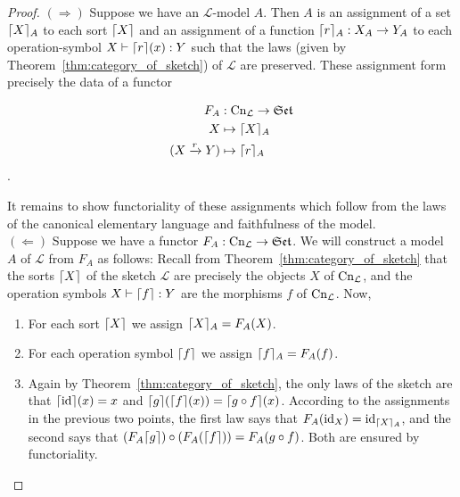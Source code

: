 \documentclass[12pt,twoside]{reedthesis}
\theoremstyle{definition}
\theoremstyle{remark}
\theoremstyle{plain}
\DeclarePairedDelimiter\ceil{\lceil}{\rceil}
\begin{document}
\begin{proof}
  \( (\Rightarrow) \) Suppose we have an \( \mathcal{L}\)-model $A$. Then $A$ is an
  assignment of a set $\ceil{X}_{A}$ to each sort \( \ceil{X}\) and an
  assignment of a function \( \ceil{r}_{A} : X_{A} \rightarrow Y_{A}\) to each operation-symbol
  \( X \vdash \ceil{r}(x) : Y\) such that the laws (given by
  Theorem~\ref{thm:category_of_sketch}) of \( \mathcal{L} \) are preserved. These
  assignment form precisely the data of a functor

  \begin{align*}
   F_{A} &: \cn_{\mathcal{L}} \rightarrow \mathfrak{Set} \\
    X &\mapsto \ceil{X}_{A} \\
    (X \xrightarrow{r} Y) &\mapsto \ceil{r}_{A}
  \end{align*}.

  It remains to show functoriality of these assignments which follow from the
  laws of the canonical elementary language and faithfulness of the model. \\

  \( (\Leftarrow) \) Suppose we have a functor
  $F_A : \mathrm{Cn}_{\mathcal{L}} \rightarrow \mathfrak{Set}$. We will construct a model $A$ of
  $\mathcal{L}$ from $F_{A}$ as follows: Recall from
  Theorem~\ref{thm:category_of_sketch} %
  that the sorts \(\ceil{X} \) of the sketch $\mathcal{L}$ are precisely the
  objects $X$ of \( \mathrm{Cn}_{ \mathcal{L}} \), and the operation symbols
  \( X \vdash \ceil{ f } : Y \) are the morphisms \( f \) of \( \mathrm{Cn}_{\mathcal{L}}\). Now,
  \begin{enumerate}
    \item For each sort \(\ceil{X}\) we assign \( \ceil{X}_A = F_{A}(X)\).
    \item For each operation symbol \( \ceil{f} \) we assign \( \ceil{f}_{A} = F_{A}(f) \).
    \item Again by Theorem~\ref{thm:category_of_sketch}, the only laws of the
          sketch are that \(\ceil{\text{id}}(x) = x\) and
          \(\ceil{g}(\ceil{f}(x)) = \ceil{g \circ f}(x)\). According to the
          assignments in the previous two points, the first law says that
          \(F_{A}(\text{id}_{X}) = \text{id}_{\ceil{X}_{A}}\), and the second says that
          \( (F_{A} \ceil{g}) \circ (F_{A}(\ceil{f})) = F_{A} (g \circ f)\). Both are
          ensured by functoriality.
  \end{enumerate}
\end{proof}
\end{document}

